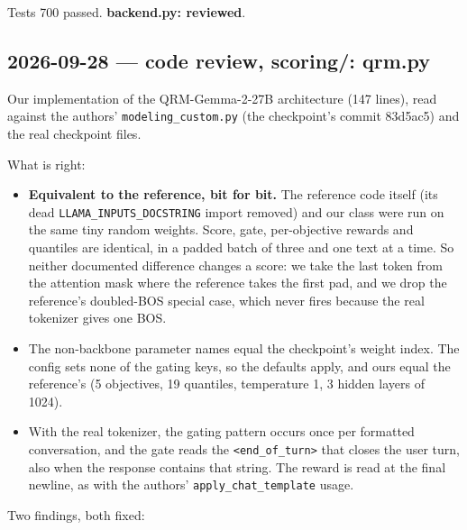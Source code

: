 \documentclass{article}
\begin{document}
Tests 700 passed. \textbf{backend.py: reviewed}.

\subsection*{2026-09-28 --- code review, scoring/: qrm.py}
Our implementation of the QRM-Gemma-2-27B architecture (147 lines), read against the authors'
\texttt{modeling\_custom.py} (the checkpoint's commit 83d5ac5) and the real checkpoint files.

What is right:
\begin{itemize}
  \item \textbf{Equivalent to the reference, bit for bit.} The reference code itself (its dead
        \texttt{LLAMA\_INPUTS\_DOCSTRING} import removed) and our class were run on the same tiny random
        weights. Score, gate, per-objective rewards and quantiles are identical, in a padded batch of three and
        one text at a time. So neither documented difference changes a score: we take the last token from the
        attention mask where the reference takes the first pad, and we drop the reference's doubled-BOS special
        case, which never fires because the real tokenizer gives one BOS.
  \item The non-backbone parameter names equal the checkpoint's weight index. The config sets none of the gating
        keys, so the defaults apply, and ours equal the reference's (5 objectives, 19 quantiles, temperature 1,
        3 hidden layers of 1024).
  \item With the real tokenizer, the gating pattern occurs once per formatted conversation, and the gate reads
        the \texttt{<end\_of\_turn>} that closes the user turn, also when the response contains that string. The
        reward is read at the final newline, as with the authors' \texttt{apply\_chat\_template} usage.
\end{itemize}
Two findings, both fixed:
\end{document}
